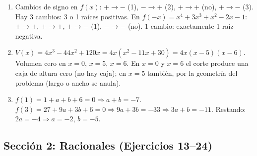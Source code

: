 \documentclass[12pt, a4paper]{article}
\begin{document}
\begin{enumerate}[leftmargin=*, label=\textbf{\arabic*.}]
  \item Cambios de signo en $f(x)$: $+ \to -$ (1), $- \to +$ (2), $+ \to +$ (no), $+ \to -$ (3). Hay 3 cambios: 3 o 1 raíces positivas. En $f(-x) = x^4 + 3x^3 + x^2 - 2x - 1$: $+ \to +$, $+ \to +$, $+ \to -$ (1), $- \to -$ (no). 1 cambio: exactamente 1 raíz negativa.

  \item $V(x) = 4x^3 - 44x^2 + 120x = 4x(x^2 - 11x + 30) = 4x(x - 5)(x - 6)$. Volumen cero en $x = 0$, $x = 5$, $x = 6$. En $x = 0$ y $x = 6$ el corte produce una caja de altura cero (no hay caja); en $x = 5$ también, por la geometría del problema (largo o ancho se anula).

  \item $f(1) = 1 + a + b + 6 = 0 \Rightarrow a + b = -7$. $f(3) = 27 + 9a + 3b + 6 = 0 \Rightarrow 9a + 3b = -33 \Rightarrow 3a + b = -11$. Restando: $2a = -4 \Rightarrow a = -2$, $b = -5$.
\end{enumerate}

\newpage

\subsection*{Sección 2: Racionales (Ejercicios 13--24)}
\end{document}
